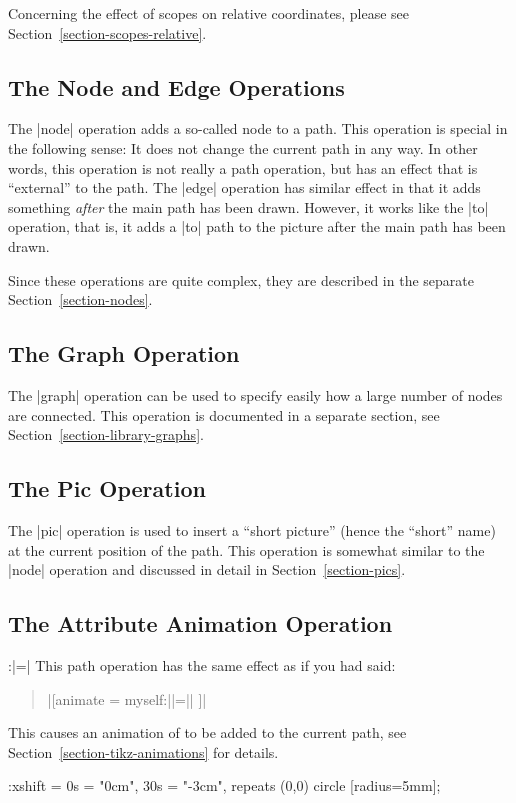 Concerning the effect of scopes on relative coordinates, please see
Section~\ref{section-scopes-relative}.


\subsection{The Node and Edge Operations}

The |node| operation adds a so-called node to a path. This operation is special
in the following sense: It does not change the current path in any way. In
other words, this operation is not really a path operation, but has an effect
that is ``external'' to the path. The |edge| operation has similar effect in
that it adds something \emph{after} the main path has been drawn. However, it
works like the |to| operation, that is, it adds a |to| path to the picture
after the main path has been drawn.

Since these operations are quite complex, they are described in the separate
Section~\ref{section-nodes}.


\subsection{The Graph Operation}

The |graph| operation can be used to specify easily how a large number of nodes
are connected. This operation is documented in a separate section, see
Section~\ref{section-library-graphs}.


\subsection{The Pic Operation}

The |pic| operation is used to insert a ``short picture'' (hence the ``short''
name) at the current position of the path. This operation is somewhat similar
to the |node| operation and discussed in detail in Section~\ref{section-pics}.


\subsection{The Attribute Animation Operation}

\begin{pathoperation}{:}{|=|}
    This path operation has the same effect as if you had said:
    \begin{quote}
        |[animate = { myself:||=||} ]|
    \end{quote}
    This causes an animation of  to be added to the
    current path, see Section~\ref{section-tikz-animations} for details.
\begin{codeexample}[imagesource={standalone/pgfmanual-en-tikz-paths-animation-1.svg}]
\tikz \draw :xshift = {0s = "0cm", 30s = "-3cm", repeats} (0,0) circle [radius=5mm];
\end{codeexample}
\end{pathoperation}


